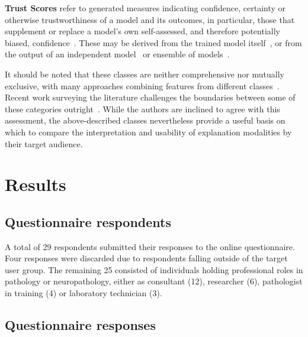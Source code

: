 \documentclass[final,5p,times,twocolumn,hyphens]{elsarticle}
\begin{document}
\textbf{Trust Scores} refer to generated measures indicating confidence, certainty or otherwise trustworthiness of a model and its outcomes, in particular, those that supplement or replace a model's own self-assessed, and therefore potentially biased, confidence~\cite{jiang2018trust, wang2021ai}. These may be derived from the trained model itself~\cite{tagasovska2019single}, or from the output of an independent model~\cite{jiang2018trust} or ensemble of models~\cite{pearce2018high}.

It should be noted that these classes are neither comprehensive nor mutually exclusive, with many approaches combining features from different classes~\cite{kim2016examples,liu2019generative}. Recent work surveying the literature challenges the boundaries between some of these categories outright~\cite{zhang2021survey}. While the authors are inclined to agree with this assessment, the above-described classes nevertheless provide a useful basis on which to compare the interpretation and usability of explanation modalities by their target audience.

\section{Results}
\label{sec:results}

\subsection{Questionnaire respondents}

A total of 29 respondents submitted their responses to the online questionnaire. Four responses were discarded due to respondents falling outside of the target user group. The remaining 25 consisted of individuals holding professional roles in pathology or neuropathology, either as consultant (12), researcher (6), pathologist in training (4) or laboratory technician (3). 

\subsection{Questionnaire responses}
\end{document}
